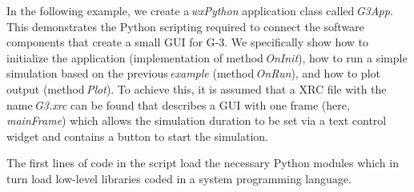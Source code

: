 \documentclass[10pt]{article}
\begin{document}
In the following example, we create a\,{\it wxPython} application class
called\,{\it G3App}. This demonstrates the Python scripting required to
connect the software components that create a small GUI for G-3.  We
specifically show how to initialize the application (implementation of
method\,{\it OnInit}), how to run a simple simulation based on the
previous\,{\it example} (method\,{\it OnRun}), and how to plot output
(method\,{\it Plot}).  To achieve this, it is assumed that a XRC file with the
name\,{\it G3.xrc} can be found that describes a GUI with one frame
(here,\,{\it mainFrame}) which allows the simulation duration to be set
via a text control widget and contains a button to start the simulation.

The first lines of code in the script load the necessary Python
modules which in turn load low-level libraries coded in a system
programming language. %
\end{document}
